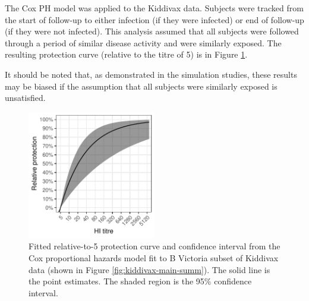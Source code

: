 The Cox PH model was applied to the Kiddivax data. Subjects were tracked from the start of follow-up to either infection (if they were infected) or end of follow-up (if they were not infected). This analysis assumed that all subjects were followed through a period of similar disease activity and were similarly exposed. The resulting protection curve (relative to the titre of 5) is in Figure \ref{fig:kiddyvaxmain-cox}.

It should be noted that, as demonstrated in the simulation studies, these results may be biased if the assumption that all subjects were similarly exposed is unsatisfied.

\begin{figure}[htp]
    \centering
    \includegraphics[width=0.5\textwidth]{../fit-cox-plot/kiddyvaxmain-bvic.pdf}
    \caption{
        Fitted relative-to-5 protection curve and confidence interval from the Cox proportional hazards model fit to B Victoria subset of Kiddivax data (shown in Figure \ref{fig:kiddivax-main-summ}). The solid line is the point estimates. The shaded region is the 95\% confidence interval.
    }
    \label{fig:kiddyvaxmain-cox}
\end{figure}
